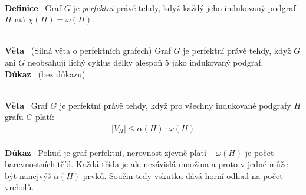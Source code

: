 \documentclass{article}
\renewcommand{\paragraph}[1]{\ \\\smallskip\noindent\textbf{#1}\ }
\begin{document}
\paragraph{Definice}
Graf $G$ je \textit{perfektní}  právě tehdy, když každý jeho indukovaný podgraf 
$H$ má $\chi(H) = \omega(H)$.

\paragraph{Věta} (Silná věta o perfektních grafech) Graf $G$ je perfektní právě 
tehdy, když $G$ ani $\overline{G}$ neobsahují lichý cyklus délky alespoň 5 jako 
indukovaný podgraf.
\paragraph{Důkaz} (bez důkazu)

\paragraph{Věta} Graf $G$ je perfektní právě tehdy, když pro všechny indukované 
podgrafy $H$ grafu $G$ platí:
\begin{align}
	\label{perfgr:slaba-nerovnost} |V_H| \leq \alpha(H) \cdot \omega(H)
\end{align}
\paragraph{Důkaz}
Pokud je graf perfektní, nerovnost zjevně platí -- $\omega(H)$ je počet 
barevnostních tříd. Každá třída je ale nezávislá množina a proto v jedné může 
být nanejvýš $\alpha(H)$ prvků. Součin tedy vskutku dává horní odhad na počet 
vrcholů.
\end{document}
